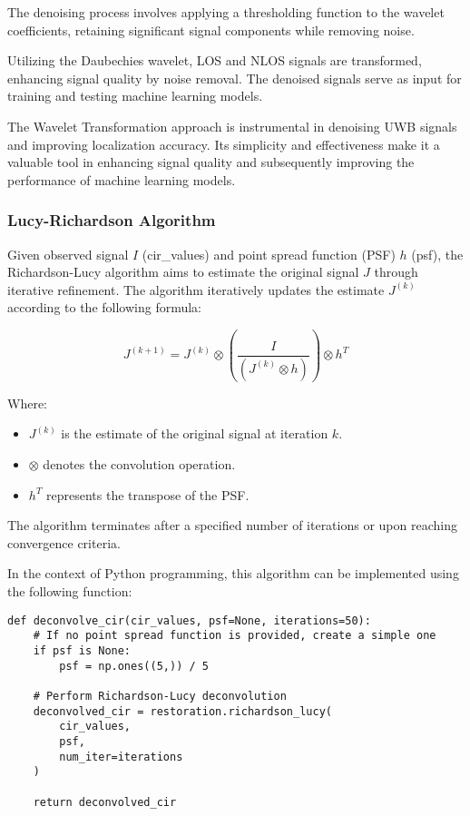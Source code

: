 The denoising process involves applying a thresholding function to the wavelet coefficients, retaining significant signal components while removing noise.

Utilizing the Daubechies wavelet, LOS and NLOS signals are transformed, enhancing signal quality by noise removal. The denoised signals serve as input for training and testing machine learning models.

The Wavelet Transformation approach is instrumental in denoising UWB signals and improving localization accuracy. Its simplicity and effectiveness make it a valuable tool in enhancing signal quality and subsequently improving the performance of machine learning models.

\subsubsection{Lucy-Richardson Algorithm}

Given observed signal $I$ (cir\_values) and point spread function (PSF) $h$ (psf), the Richardson-Lucy algorithm aims to estimate the original signal $J$ through iterative refinement. The algorithm iteratively updates the estimate $J^{(k)}$ according to the following formula:

\begin{equation}
J^{(k+1)} = J^{(k)} \otimes \left( \frac{I}{(J^{(k)} \otimes h)} \right) \otimes h^T
\end{equation}

Where:
\begin{itemize}
    \item $J^{(k)}$ is the estimate of the original signal at iteration $k$.
    \item $\otimes$ denotes the convolution operation.
    \item $h^T$ represents the transpose of the PSF. 
\end{itemize}


The algorithm terminates after a specified number of iterations or upon reaching convergence criteria.

In the context of Python programming, this algorithm can be implemented using the following function:

\begin{verbatim}
def deconvolve_cir(cir_values, psf=None, iterations=50):
    # If no point spread function is provided, create a simple one
    if psf is None:
        psf = np.ones((5,)) / 5

    # Perform Richardson-Lucy deconvolution
    deconvolved_cir = restoration.richardson_lucy(
        cir_values, 
        psf, 
        num_iter=iterations
    )

    return deconvolved_cir
\end{verbatim}

